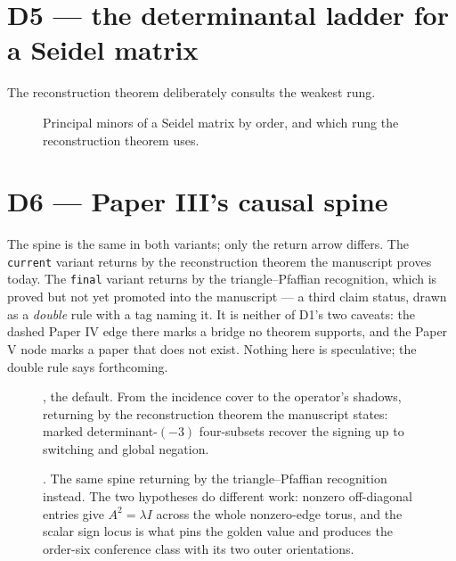 \documentclass[11pt]{article}
\begin{document}
\clearpage
\section*{D5 --- the determinantal ladder for a Seidel matrix}

The reconstruction theorem deliberately consults the weakest rung.

\begin{figure}[H]
\centering
\ClebschMinorLadder
\caption{Principal minors of a Seidel matrix by order, and which rung the
reconstruction theorem uses.}
\end{figure}

\clearpage
\section*{D6 --- Paper III's causal spine}

The spine is the same in both variants; only the return arrow differs.  The
\texttt{current} variant returns by the reconstruction theorem the
manuscript proves today.  The \texttt{final} variant returns by the
triangle--Pfaffian recognition, which is proved but not yet promoted into
the manuscript --- a third claim status, drawn as a \emph{double} rule with
a tag naming it.  It is neither of D1's two caveats: the dashed Paper IV
edge there marks a bridge no theorem supports, and the Paper V node marks a
paper that does not exist.  Nothing here is speculative; the double rule
says forthcoming.

\begin{figure}[H]
\centering
\ClebschCausalSpine[current]
\caption{\texttt{\string\ClebschCausalSpine[current]}, the default.  From the
incidence cover to the operator's shadows, returning by the reconstruction
theorem the manuscript states: marked determinant-\((-3)\) four-subsets
recover the signing up to switching and global negation.}
\end{figure}

\clearpage
\begin{figure}[H]
\centering
\ClebschCausalSpine[final]
\caption{\texttt{\string\ClebschCausalSpine[final]}.  The same spine
returning by the triangle--Pfaffian recognition instead.  The two
hypotheses do different work: nonzero off-diagonal entries give
\(A^{2}=\lambda I\) across the whole nonzero-edge torus, and the scalar
sign locus is what pins the golden value and produces the order-six
conference class with its two outer orientations.}
\end{figure}
\end{document}
